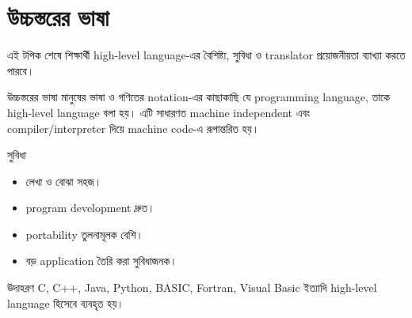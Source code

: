 \section{উচ্চস্তরের ভাষা}

\begin{learningbox}
এই টপিক শেষে শিক্ষার্থী high-level language-এর বৈশিষ্ট্য, সুবিধা ও translator প্রয়োজনীয়তা ব্যাখ্যা করতে পারবে।
\end{learningbox}

\begin{definitionbox}{উচ্চস্তরের ভাষা}
মানুষের ভাষা ও গণিতের notation-এর কাছাকাছি যে programming language, তাকে high-level language বলা হয়। এটি সাধারণত machine independent এবং compiler/interpreter দিয়ে machine code-এ রূপান্তরিত হয়।
\end{definitionbox}

\begin{keypointbox}{সুবিধা}
\begin{itemize}
\item লেখা ও বোঝা সহজ।
\item program development দ্রুত।
\item portability তুলনামূলক বেশি।
\item বড় application তৈরি করা সুবিধাজনক।
\end{itemize}
\end{keypointbox}

\begin{examplebox}{উদাহরণ}
C, C++, Java, Python, BASIC, Fortran, Visual Basic ইত্যাদি high-level language হিসেবে ব্যবহৃত হয়।
\end{examplebox}
